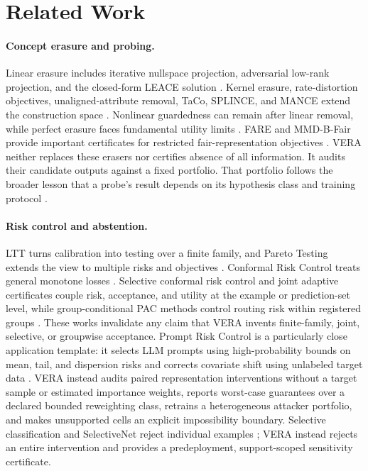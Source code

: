 \section{Related Work}

\paragraph{Concept erasure and probing.}
Linear erasure includes iterative nullspace projection, adversarial
low-rank projection, and the closed-form LEACE solution
\cite{ravfogel2020null,ravfogel2022linear,belrose2023leace}. Kernel erasure,
rate-distortion objectives, unaligned-attribute removal, TaCo, SPLINCE, and
MANCE extend the construction space
\cite{ravfogel2022kernel,chowdhury2023kram,shao2023unaligned,jourdan2023taco,holstege2025splince,avitan2026mance}.
Nonlinear guardedness can remain after linear removal, while perfect erasure
faces fundamental utility limits
\cite{akbari2025obliviator,chowdhury2025limits}. FARE and MMD-B-Fair provide
important certificates for restricted fair-representation objectives
\cite{jovanovic2023fare,deka2023mmdbfair}. VERA neither replaces these erasers
nor certifies absence of all information. It audits their candidate outputs
against a fixed portfolio. That portfolio follows the broader lesson that a
probe's result depends on its hypothesis class and training protocol
\cite{hewitt2019control,pimentel2020probing,voita2020mdl,elazar2021amnesic}.

\paragraph{Risk control and abstention.}
LTT turns calibration into testing over a finite family, and Pareto Testing
extends the view to multiple risks and objectives
\cite{angelopoulos2025ltt,laufer2023pareto}. Conformal Risk Control treats
general monotone losses \cite{angelopoulos2024crc}. Selective conformal risk
control and joint adaptive certificates couple risk, acceptance, and utility at
the example or prediction-set level, while group-conditional PAC methods
control routing risk within registered groups
\cite{xu2025scrc,yu2026joint,huang2026conditional}. These works invalidate any
claim that VERA invents finite-family, joint, selective, or groupwise
acceptance. Prompt Risk Control
is a particularly close application template: it selects LLM prompts using
high-probability bounds on mean, tail, and dispersion risks and corrects
covariate shift using unlabeled target data \cite{zollo2024prompt}. VERA instead
audits paired representation interventions without a target sample or estimated
importance weights, reports worst-case guarantees over a declared bounded
reweighting class, retrains a heterogeneous attacker portfolio, and makes
unsupported cells an explicit impossibility boundary. Selective
classification and SelectiveNet reject individual examples
\cite{elyaniv2010foundations,geifman2017selective,geifman2019selectivenet}; VERA
instead rejects an entire intervention and provides a predeployment,
support-scoped sensitivity certificate.

